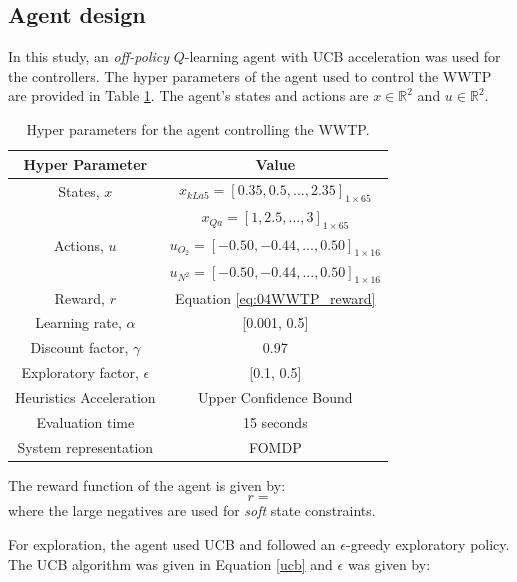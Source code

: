 \subsection{Agent design}
In this study, an \textit{off-policy} $Q$-learning agent with UCB acceleration was used for the controllers.  The hyper parameters of the agent used to control the WWTP are provided in Table \ref{tab:04WWTPagent}. The agent's states and actions are $x \in \mathbb{R}^2$ and $u \in \mathbb{R}^2$. 

\begin{table}[H]
\caption{Hyper parameters for the agent controlling the WWTP.}
\label{tab:04WWTPagent}
\centering
\begin{tabular}{c|c}
\textbf{Hyper Parameter}     & \textbf{Value}  \\
\hline
States, $x$	             	& $x_{kLa5} = [0.35, 0.5, ..., 2.35]_{1 \times 65} $		 \\
        	             	& $x_{Qa} = [1, 2.5, ..., 3]_{1 \times 65} $		 \\
Actions, $u$                & $u_{O_2} = [-0.50, -0.44, ..., 0.50]_{1 \times 16}$	         \\
                            & $u_{N^2} = [-0.50, -0.44, ..., 0.50]_{1 \times 16}$		\\
Reward, $r$	                & Equation \ref{eq:04WWTP_reward}		\\
Learning rate, $\alpha$		& [0.001, 0.5]		 \\
Discount factor, $\gamma$      	& 0.97  \\
Exploratory factor, $\epsilon$             & [0.1, 0.5]  \\
Heuristics Acceleration     & Upper Confidence Bound \\
Evaluation time                 & 15 seconds \\
System representation           & FOMDP \\
\end{tabular}
\end{table}

The reward function of the agent is given by:
\begin{equation}
    r = 
    \label{eq:04WWTP_reward}
\end{equation}
where the large negatives are used for \textit{soft} state constraints.

For exploration, the agent used UCB and followed an $\epsilon$-greedy exploratory policy.  The UCB algorithm was given in Equation \ref{ucb} and $\epsilon$ was given by:
\begin{equation}
    
\end{equation}

